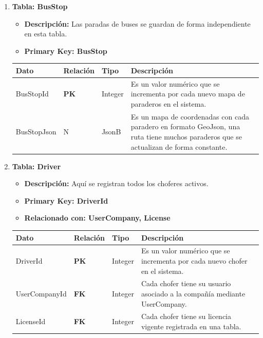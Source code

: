 \documentclass[12pt]{article}
\begin{document}
\begin{enumerate}
    \item \textbf{Tabla: BusStop}
    \begin{itemize}
        \item \textbf{Descripción:} Las paradas de buses se guardan de forma independiente en esta tabla.
        \item \textbf{Primary Key: BusStop}
    \end{itemize}
    \begin{table}[!h]
        \centering
        \begin{tabular}{|p{3cm}|p{2cm}|p{2.5cm}|p{8cm}|}
             \hline
             \textbf{Dato} & \textbf{Relación} & \textbf{Tipo} & \textbf{Descripción} \\
             \hline
             BusStopId & \textbf{PK} & Integer & Es un valor numérico que se incrementa por cada nuevo mapa de paraderos en el sistema. \\
             \hline
             BusStopJson & N & JsonB & Es un mapa de coordenadas con cada paradero en formato GeoJson, una ruta tiene muchos paraderos que se actualizan de forma constante. \\
             \hline
        \end{tabular}
    \end{table}

    \newpage
    \item \textbf{Tabla: Driver}
    \begin{itemize}
        \item \textbf{Descripción:} Aquí se registran todos los choferes activos.
        \item \textbf{Primary Key: DriverId}
        \item \textbf{Relacionado con: UserCompany, License}
    \end{itemize}
    \begin{table}[!h]
        \centering
        \begin{tabular}{|p{3cm}|p{2cm}|p{2.5cm}|p{8cm}|}
             \hline
             \textbf{Dato} & \textbf{Relación} & \textbf{Tipo} & \textbf{Descripción} \\
             \hline
             DriverId & \textbf{PK} & Integer & Es un valor numérico que se incrementa por cada nuevo chofer en el sistema. \\
             \hline
             UserCompanyId & \textbf{FK} & Integer & Cada chofer tiene su usuario asociado a la compañía mediante UserCompany. \\
             \hline
             LicenseId & \textbf{FK} & Integer & Cada chofer tiene su licencia vigente registrada en una tabla.\\
             \hline
        \end{tabular}
    \end{table}


\end{enumerate}
\end{document}
